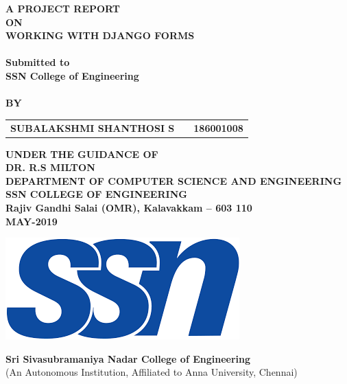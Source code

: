 \newpage
\begin{center}
\thispagestyle{empty}
\Large{\textbf{A PROJECT REPORT\\ON}}\\[0.3cm]
\Large{\textsc {\textbf{WORKING WITH DJANGO FORMS}}}\\
\Large{\textbf{\\Submitted to}}
\LARGE{\textbf{\\SSN College of Engineering\\}}
\vspace{1cm}
\Large{\textbf{\\BY}}\\[0.5cm]
\begin{table}[h]
	\centering
	\Large{
		\begin{tabular}{>{\bfseries}lc>{\bfseries}r}
			SUBALAKSHMI SHANTHOSI S & & 186001008 \\
	\end{tabular}}
\end{table}
\vspace{0.5cm}
\large{\textbf{UNDER THE GUIDANCE OF}}\\
\large{\textbf{DR. R.S MILTON}}\\
\vspace{1cm}
\large{\textbf{DEPARTMENT OF COMPUTER SCIENCE AND ENGINEERING}}\\
\Large{\textbf{SSN COLLEGE OF ENGINEERING}}\\
\vspace{0.5cm}
\large{\textbf{Rajiv Gandhi Salai (OMR), Kalavakkam -- 603 110 }}
\large{\textbf{\\MAY-2019}}\\
\vspace{1cm}

\includegraphics[scale=0.35]{ssnLogoNew.png}

\Large{\textbf{Sri Sivasubramaniya Nadar College of Engineering\\}}
{(An Autonomous Institution, Affiliated to Anna University, Chennai)}\\
\end{center}
